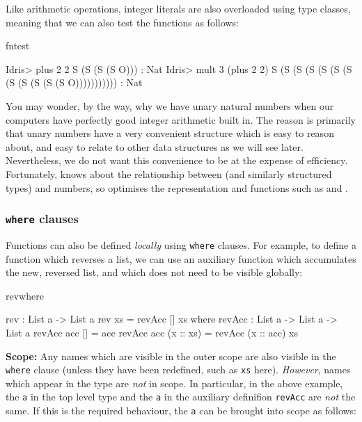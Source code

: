 \noindent
Like arithmetic operations, integer literals are also overloaded using type classes, 
meaning that we can also test the functions as follows:

\begin{SaveVerbatim}{fntest}

Idris> plus 2 2 
S (S (S (S O))) : Nat
Idris> mult 3 (plus 2 2)
S (S (S (S (S (S (S (S (S (S (S (S O))))))))))) : Nat

\end{SaveVerbatim}

\noindent
You may wonder, by the way, why we have unary natural numbers when our
computers have perfectly good integer arithmetic built in. The reason is
primarily that unary numbers have a very convenient structure which is easy to
reason about, and easy to relate to other data structures as we will see later.
Nevertheless, we do not want this convenience to be at the expense of
efficiency. Fortunately, \Idris{} knows about the relationship between
 (and similarly structured types) and numbers, so optimises the
representation and functions such as  and .

\subsubsection*{\texttt{where} clauses}

Functions can also be defined \emph{locally} using \texttt{where} clauses. For example,
to define a function which reverses a list, we can use an auxiliary function which
accumulates the new, reversed list, and which does not need to be visible globally:

\begin{SaveVerbatim}{revwhere}

rev : List a -> List a
rev xs = revAcc [] xs where {
  revAcc : List a -> List a -> List a
  revAcc acc [] = acc
  revAcc acc (x :: xs) = revAcc (x :: acc) xs
}

\end{SaveVerbatim}

\noindent
\textbf{Scope:} 
Any names which are visible in the outer scope are also visible in the \texttt{where}
clause (unless they have been redefined, such as \texttt{xs} here).
\emph{However}, names which appear in the type are \emph{not} in scope. In particular,
in the above example, the \texttt{a} in the top level type and the \texttt{a} in the
auxiliary definifion \texttt{revAcc} are \emph{not} the same. If this is the required
behaviour, the \texttt{a} can be brought into scope as follows:

